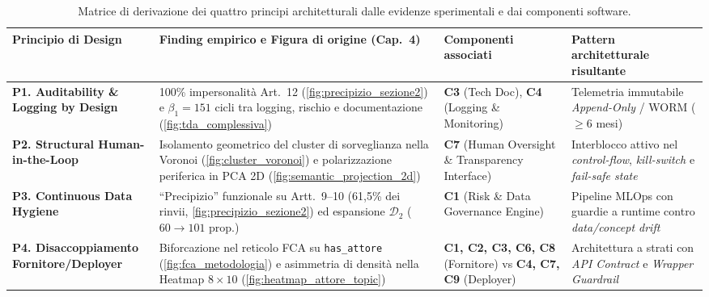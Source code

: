 \documentclass[12pt,a4paper,oneside]{report}
\begin{document}
\begin{table}[htbp]
\centering
\caption{Matrice di derivazione dei quattro principi architetturali dalle evidenze sperimentali e dai componenti software.}
\label{tab:distillazione_principi}
\footnotesize
\renewcommand{\arraystretch}{1.25}
\begin{tabularx}{\textwidth}{>{\bfseries}p{2.8cm} X p{2.5cm} p{3.2cm}}
\toprule
\textbf{Principio di Design} & \textbf{Finding empirico e Figura di origine (Cap.~4)} & \textbf{Componenti associati} & \textbf{Pattern architetturale risultante} \\
\midrule
P1. Auditability \& Logging by Design & 100\% impersonalità Art.~12 (\cref{fig:precipizio_sezione2}) e $\beta_1 = 151$ cicli tra logging, rischio e documentazione (\cref{fig:tda_complessiva}) & \textbf{C3} (Tech Doc), \textbf{C4} (Logging \& Monitoring) & Telemetria immutabile \emph{Append-Only} / WORM ($\ge 6$ mesi) \\
\addlinespace[2pt]
P2. Structural Human-in-the-Loop & Isolamento geometrico del cluster di sorveglianza nella Voronoi (\cref{fig:cluster_voronoi}) e polarizzazione periferica in PCA 2D (\cref{fig:semantic_projection_2d}) & \textbf{C7} (Human Oversight \& Transparency Interface) & Interblocco attivo nel \emph{control-flow}, \emph{kill-switch} e \emph{fail-safe state} \\
\addlinespace[2pt]
P3. Continuous Data Hygiene & ``Precipizio'' funzionale su Artt.~9--10 (61,5\% dei rinvii, \cref{fig:precipizio_sezione2}) ed espansione $\mathcal{D}_2$ ($60 \to 101$ prop.) & \textbf{C1} (Risk \& Data Governance Engine) & Pipeline MLOps con guardie a runtime contro \emph{data/concept drift} \\
\addlinespace[2pt]
P4. Disaccoppiamento Fornitore/Deployer & Biforcazione nel reticolo FCA su \texttt{has\_attore} (\cref{fig:fca_metodologia}) e asimmetria di densità nella Heatmap $8 \times 10$ (\cref{fig:heatmap_attore_topic}) & \textbf{C1, C2, C3, C6, C8} (Fornitore) vs \textbf{C4, C7, C9} (Deployer) & Architettura a strati con \emph{API Contract} e \emph{Wrapper Guardrail} \\
\bottomrule
\end{tabularx}
\end{table}
\end{document}
